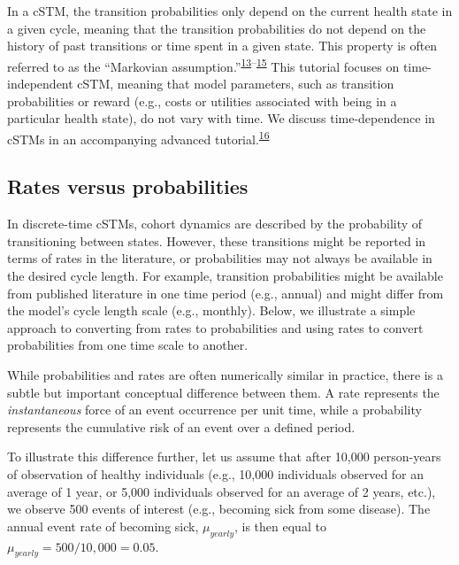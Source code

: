 \documentclass[
]{article}
\begin{document}
In a cSTM, the transition probabilities only depend on the current health state in a given cycle, meaning that the transition probabilities do not depend on the history of past transitions or time spent in a given state. This property is often referred to as the ``Markovian assumption.''\textsuperscript{\protect\hyperlink{ref-Kuntz2001}{13}--\protect\hyperlink{ref-Beck1983}{15}} This tutorial focuses on time-independent cSTM, meaning that model parameters, such as transition probabilities or reward (e.g., costs or utilities associated with being in a particular health state), do not vary with time. We discuss time-dependence in cSTMs in an accompanying advanced tutorial.\textsuperscript{\protect\hyperlink{ref-Alarid-Escudero2021b}{16}}

\hypertarget{rates-versus-probabilities}{%
\subsection{Rates versus probabilities}\label{rates-versus-probabilities}}

In discrete-time cSTMs, cohort dynamics are described by the probability of transitioning between states. However, these transitions might be reported in terms of rates in the literature, or probabilities may not always be available in the desired cycle length. For example, transition probabilities might be available from published literature in one time period (e.g., annual) and might differ from the model's cycle length scale (e.g., monthly). Below, we illustrate a simple approach to converting from rates to probabilities and using rates to convert probabilities from one time scale to another.

While probabilities and rates are often numerically similar in practice, there is a subtle but important conceptual difference between them. A rate represents the \textit{instantaneous} force of an event occurrence per unit time, while a probability represents the cumulative risk of an event over a defined period.

To illustrate this difference further, let us assume that after 10,000 person-years of observation of healthy individuals (e.g., 10,000 individuals observed for an average of 1 year, or 5,000 individuals observed for an average of 2 years, etc.), we observe 500 events of interest (e.g., becoming sick from some disease). The annual event rate of becoming sick, \(\mu_{yearly}\), is then equal to \(\mu_{yearly}=500 / 10,000=0.05\).
\end{document}
